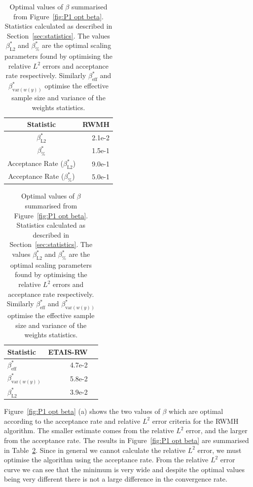 \documentclass[final]{siamltex}
\begin{document}
\begin{table}[!htb]
    \begin{minipage}{.5\linewidth}
      \centering
        \begin{tabular}{|c|r|}
	\hline
	Statistic											& RWMH \\ \hline
	$\beta_{\text{L2}}^*$								& 2.1e-2 \\
	$\beta_{\%}^*$									& 1.5e-1 \\
	Acceptance Rate ($\beta_{\text{L2}}^*$)				& 9.0e-1 \\
	Acceptance Rate ($\beta_{\%}^*$)					& 5.0e-1 \\
	\hline
	\end{tabular}
    \end{minipage}%
    \begin{minipage}{.5\linewidth}
      \centering
        \begin{tabular}{|l|r|r|}
	\hline
	Statistic							& ETAIS-RW \\ \hline
	$\beta_{\text{eff}}^*$				& 4.7e-2 \\
	$\beta_{\text{var}(w(y))}^*$		& 5.8e-2 \\
	$\beta_{\text{L2}}^*$				& 3.9e-2 \\
	\hline
	\end{tabular}
    \end{minipage}
	\vspace{1mm}
	\caption{Optimal values of $\beta$ summarised from Figure~\ref{fig:P1 opt beta}. Statistics calculated as described in Section~\ref{sec:statistics}. The values $\beta^*_{\text{L2}}$ and $\beta^*_{\%}$ are the optimal scaling parameters found by optimising the relative $L^2$ errors and acceptance rate respectively. Similarly $\beta_{\text{eff}}^*$ and $\beta_{\text{var}(w(y))}^*$ optimise the effective sample size and variance of the weights statistics.}
	\label{table:prob1 opt beta}
\end{table}

Figure~\ref{fig:P1 opt beta} (a) shows the two values of $\beta$ which
are optimal according to the acceptance rate and relative $L^2$ error
criteria for the RWMH algorithm. The smaller estimate comes from the
relative $L^2$ error, and the larger from the acceptance rate. The
results in Figure~\ref{fig:P1 opt beta} are summarised in
Table~\ref{table:prob1 opt beta}. Since in general we cannot calculate
the relative $L^2$ error, we must optimise the algorithm using the
acceptance rate. From the relative $L^2$ error curve we can see that
the minimum is very wide and despite the optimal values being very
different there is not a large difference in the convergence rate.
\end{document}
